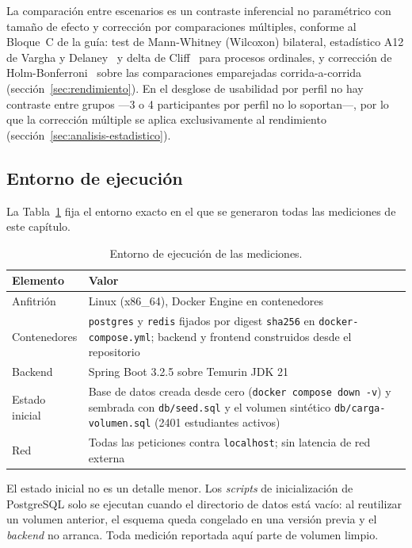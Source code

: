 \documentclass[11pt,a4paper]{article}
\newcommand{\ruta}[1]{\texttt{\footnotesize #1}}
\begin{document}
La comparación entre escenarios es un contraste inferencial no paramétrico
con tamaño de efecto y corrección por comparaciones múltiples, conforme al
Bloque~C de la guía: test de Mann-Whitney (Wilcoxon) bilateral, estadístico
A12 de Vargha y Delaney~\cite{varghadelaney2000} y delta de
Cliff~\cite{cliff1993} para procesos ordinales, y corrección de
Holm-Bonferroni~\cite{holm1979} sobre las comparaciones emparejadas
corrida-a-corrida (sección~\ref{sec:rendimiento}). En el desglose de
usabilidad por perfil no hay contraste entre grupos —3 o 4 participantes
por perfil no lo soportan—, por lo que la corrección múltiple se aplica
exclusivamente al rendimiento (sección~\ref{sec:analisis-estadistico}).

\subsection{Entorno de ejecución}
\label{sec:entorno}

La Tabla~\ref{tab:entorno} fija el entorno exacto en el que se
generaron todas las mediciones de este capítulo.

\begin{table}[htbp]
\centering
\caption{Entorno de ejecución de las mediciones.}
\label{tab:entorno}
\begin{tabular}{@{}lp{9.2cm}@{}}
\toprule
\textbf{Elemento} & \textbf{Valor} \\
\midrule
Anfitrión & Linux (x86\_64), Docker Engine en contenedores \\
Contenedores & \texttt{postgres} y \texttt{redis} fijados por digest \texttt{sha256} en \texttt{docker-compose.yml}; backend y frontend construidos desde el repositorio \\
Backend & Spring Boot 3.2.5 sobre Temurin JDK 21 \\
Estado inicial & Base de datos creada desde cero (\texttt{docker compose down -v}) y sembrada con \ruta{db/seed.sql} y el volumen sintético \ruta{db/carga-volumen.sql} (2401 estudiantes activos) \\
Red & Todas las peticiones contra \texttt{localhost}; sin latencia de red externa \\
\bottomrule
\end{tabular}
\end{table}

El estado inicial no es un detalle menor. Los \emph{scripts} de
inicialización de PostgreSQL solo se ejecutan cuando el directorio de datos
está vacío: al reutilizar un volumen anterior, el esquema queda congelado en
una versión previa y el \emph{backend} no arranca. Toda medición reportada
aquí parte de volumen limpio.
\end{document}

